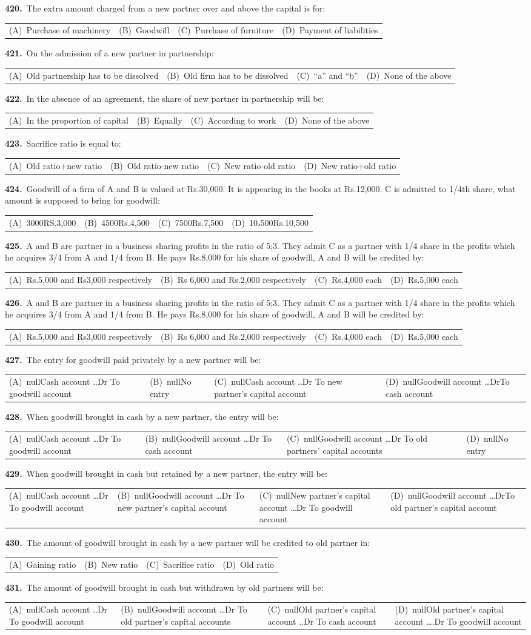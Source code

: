 \documentclass[11pt,a4paper]{article}
\makeatletter
\newcommand{\mcq}[6]{%
  \Needspace{4\baselineskip}%
  \par\medskip\noindent\textbf{#1.}\ #2\par\nopagebreak
  \noindent\begin{tabularx}{\linewidth}{@{\hspace{1.5em}}*{4}{>{\raggedright\arraybackslash}X}@{}}
    (A)~#3 & (B)~#4 & (C)~#5 & (D)~#6
  \end{tabularx}\par}
\makeatother
\begin{document}
\mcq{420}{The extra amount charged from a new partner over and above the capital is for:}{Purchase of machinery}{Goodwill}{Purchase of furniture}{Payment of liabilities}
\mcq{421}{On the admission of a new partner in partnership:}{Old partnership has to be dissolved}{Old firm has to be dissolved}{“a” and “b”}{None of the above}
\mcq{422}{In the absence of an agreement, the share of new partner in partnership will be:}{In the proportion of capital}{Equally}{According to work}{None of the above}
\mcq{423}{Sacrifice ratio is equal to:}{Old ratio+new ratio}{Old ratio-new ratio}{New ratio-old ratio}{New ratio+old ratio}
\mcq{424}{Goodwill of a firm of A and B is valued at Rs.30,000. It is appearing in the books at Rs.12,000. C is admitted to 1/4th share, what amount is supposed to bring for goodwill:}{3000RS.3,000}{4500Rs.4,500}{7500Rs.7,500}{10،500Rs.10,500}
\mcq{425}{A and B are partner in a business sharing profits in the ratio of 5;3. They admit C as a partner with 1/4 share in the profits which he acquires 3/4 from A and 1/4 from B. He pays Rs.8,000 for his share of goodwill, A and B will be credited by:}{Rs.5,000 and Rs3,000 respectively}{Rs 6,000 and Rs.2,000 respectively}{Rs.4,000 each}{Rs.5,000 each}
\mcq{426}{A and B are partner in a business sharing profits in the ratio of 5;3. They admit C as a partner with 1/4 share in the profits which he acquires 3/4 from A and 1/4 from B. He pays Rs.8,000 for his share of goodwill, A and B will be credited by:}{Rs.5,000 and Rs3,000 respectively}{Rs 6,000 and Rs.2,000 respectively}{Rs.4,000 each}{Rs.5,000 each}
\mcq{427}{The entry for goodwill paid privately by a new partner will be:}{nullCash account ..Dr To goodwill account}{nullNo entry}{nullCash account ..Dr To new partner’s capital account}{nullGoodwill account …DrTo cash account}
\mcq{428}{When goodwill brought in cash by a new partner, the entry will be:}{nullCash account …Dr To goodwill account}{nullGoodwill account …Dr To cash account}{nullGoodwill account …Dr To old partners’ capital accounts}{nullNo entry}
\mcq{429}{When goodwill brought in cash but retained by a new partner, the entry will be:}{nullCash account …Dr To goodwill account}{nullGoodwill account …Dr To new partner’s capital account}{nullNew partner’s capital account …Dr To goodwill account}{nullGoodwill account …DrTo old partner’s capital account}
\mcq{430}{The amount of goodwill brought in cash by a new partner will be credited to old partner in:}{Gaining ratio}{New ratio}{Sacrifice ratio}{Old ratio}
\mcq{431}{The amount of goodwill brought in cash but withdrawn by old partners will be:}{nullCash account ..Dr To goodwill account}{nullGoodwill account …Dr To old partner’s capital accounts}{nullOld partner’s capital account ..Dr To cash account}{nullOld partner’s capital account ….Dr To goodwill account}
\end{document}
